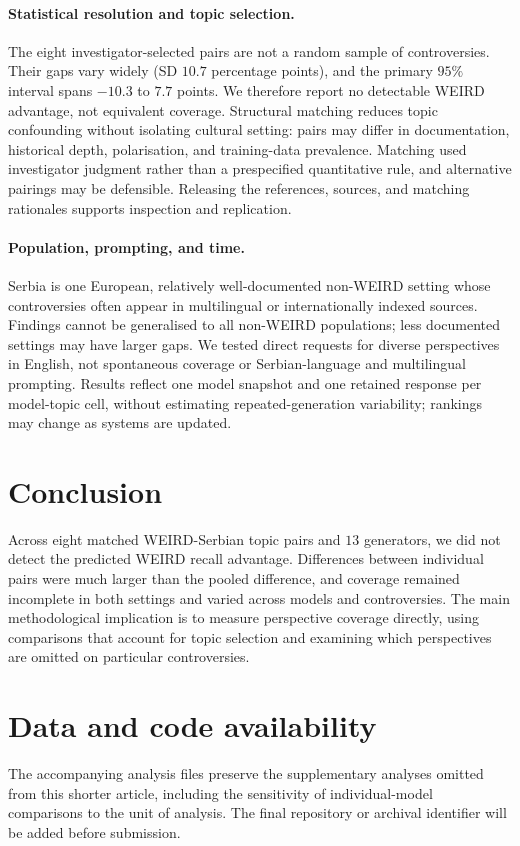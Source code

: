 \documentclass[11pt,a4paper]{article}
\begin{document}
\paragraph{Statistical resolution and topic selection.}
The eight investigator-selected pairs are not a random sample of controversies. Their gaps vary widely (SD $10.7$ percentage points), and the primary $95\%$ interval spans $-10.3$ to $7.7$ points. We therefore report no detectable WEIRD advantage, not equivalent coverage. Structural matching reduces topic confounding without isolating cultural setting: pairs may differ in documentation, historical depth, polarisation, and training-data prevalence. Matching used investigator judgment rather than a prespecified quantitative rule, and alternative pairings may be defensible. Releasing the references, sources, and matching rationales supports inspection and replication.

\paragraph{Population, prompting, and time.}
Serbia is one European, relatively well-documented non-WEIRD setting whose controversies often appear in multilingual or internationally indexed sources. Findings cannot be generalised to all non-WEIRD populations; less documented settings may have larger gaps. We tested direct requests for diverse perspectives in English, not spontaneous coverage or Serbian-language and multilingual prompting. Results reflect one model snapshot and one retained response per model-topic cell, without estimating repeated-generation variability; rankings may change as systems are updated.

\section{Conclusion}
\label{sec:Conclusion}
Across eight matched WEIRD-Serbian topic pairs and $13$ generators, we did not detect the predicted WEIRD recall advantage. Differences between individual pairs were much larger than the pooled difference, and coverage remained incomplete in both settings and varied across models and controversies. The main methodological implication is to measure perspective coverage directly, using comparisons that account for topic selection and examining which perspectives are omitted on particular controversies.


\section{Data and code availability}
The accompanying analysis files preserve the supplementary analyses omitted from this shorter article, including the sensitivity of individual-model comparisons to the unit of analysis. The final repository or archival identifier will be added before submission.
\end{document}
